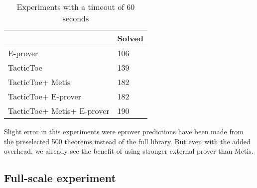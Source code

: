 \documentclass[runningheads,a4paper,draft]{svjour3}
\def\eprover{\textsf{E-prover}\xspace}
\def\metis{\textsf{Metis}\xspace}
\def\tactictoe{\textsf{TacticToe}\xspace}
\newcommand{\ra}[1]{\renewcommand{\arraystretch}{#1}}
\begin{document}

\begin{table}[h!]
\centering\ra{1.3}
\small
\begin{tabular}{ll}
\toprule
  & Solved \\
\midrule
   \eprover &  106 \\
   \tactictoe &  139 \\
   \tactictoe + \metis & 182 \\
   \tactictoe + \eprover & 182 \\
   \tactictoe + \metis + \eprover & 190 \\
  
\bottomrule
\end{tabular}
\caption{Experiments with a timeout of 60 seconds \label{tab:param}}
\end{table}

Slight error in this experiments were eprover predictions have been made from 
the preselected 500 theorems instead of the full library. But even with the 
added overhead, we already see 
the benefit of using stronger external prover than \metis.


\subsection{Full-scale experiment}

\end{document}
